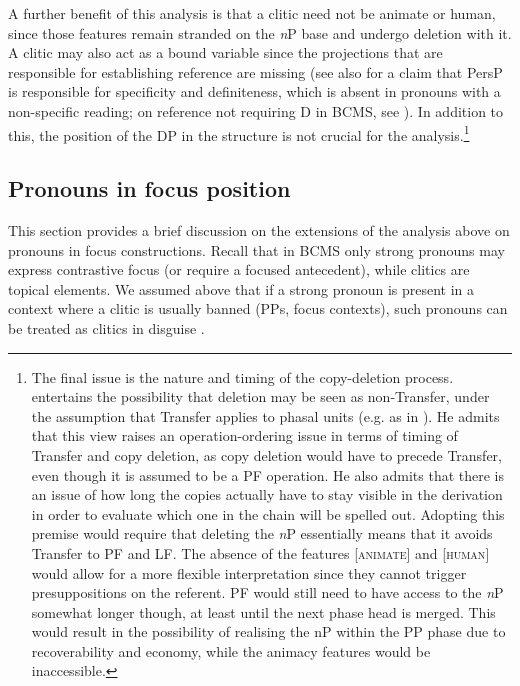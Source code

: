 \documentclass[output=paper,colorlinks,citecolor=brown]{langscibook}
\begin{document}
A further benefit of this analysis is that a clitic need not be animate or human, since those features remain stranded on the \textit{n}P base and undergo deletion with it. A clitic may also act as a bound variable since the projections that are responsible for establishing reference are missing (see also \citealt{ruda21pronounstructure,ruda21sloppy} for a claim that PersP is responsible for specificity and definiteness, which is absent in pronouns with a non-specific reading; on reference not requiring D in BCMS, see \citealt{trenkic04,branko14,branko-diss,arsenijevicetalhybrid}). In addition to this, the position of the DP in the structure is not crucial for the analysis.\footnote{The final issue is the nature and timing of the copy-deletion process.  entertains the possibility that deletion may be seen as non-Transfer, under the assumption that Transfer applies to phasal units (e.g. as in \citealt{foxpesetsky05}). He admits that this view raises an operation-ordering issue in terms of timing of Transfer and copy deletion, as copy deletion would have to precede Transfer, even though it is assumed to be a PF operation. He also admits that there is an issue of how long the copies actually have to stay visible in the derivation in order to evaluate which one in the chain will be spelled out. Adopting this premise would require that deleting the \textit{n}P essentially means that it avoids Transfer to PF and LF. The absence of the features [\textsc{animate}] and [\textsc{human}] would allow for a more flexible interpretation since they cannot trigger presuppositions on the referent. PF would still need to have access to the \textit{n}P somewhat longer though, at least until the next phase head is merged. This would result in the possibility of realising the nP within the PP phase due to recoverability and economy, while the animacy features would be inaccessible.}

\subsection{Pronouns in focus position}\label{subsec:pronounsinfocus}

This section provides a brief discussion on the extensions of the analysis above on pronouns in focus constructions. Recall that in BCMS only strong pronouns may express contrastive focus (or require a focused antecedent), while clitics are topical elements. We assumed above that if a strong pronoun is present in a context where a clitic is usually banned (PPs, focus contexts), such pronouns can be treated as clitics in disguise \citep[244]{despic11}.
\end{document}

